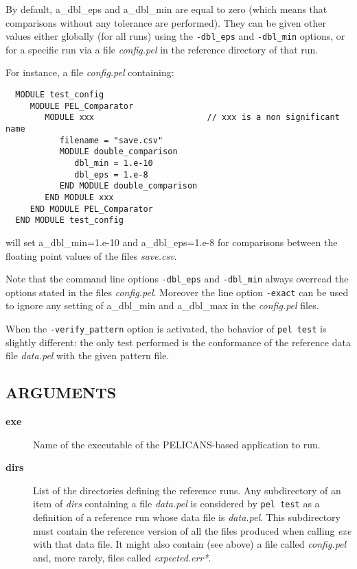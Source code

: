 \documentclass{article}
\begin{document}
\begin{description}
By default, a\_dbl\_eps and a\_dbl\_min are equal to zero (which means that
comparisons without any tolerance are performed).
They can be given other values either globally (for all runs)
using the \texttt{-dbl\_eps} and \texttt{-dbl\_min} options, or for a specific
run via a file \emph{config.pel} in the reference directory of that
run.



For instance, a file \emph{config.pel} containing:

\begin{verbatim}
  MODULE test_config
     MODULE PEL_Comparator
        MODULE xxx                       // xxx is a non significant name
           filename = "save.csv"
           MODULE double_comparison
              dbl_min = 1.e-10
              dbl_eps = 1.e-8
           END MODULE double_comparison
        END MODULE xxx
     END MODULE PEL_Comparator
  END MODULE test_config
\end{verbatim}


will set a\_dbl\_min=1.e-10 and a\_dbl\_eps=1.e-8 for comparisons between
the floating point values of the files \emph{save.csv}.



Note that the command line options \texttt{-dbl\_eps} and \texttt{-dbl\_min}
always overread the options stated in the files \emph{config.pel}.
Moreover the line option \texttt{-exact} can be used to ignore any
setting of a\_dbl\_min and a\_dbl\_max in the \emph{config.pel} files.

\end{description}


When the \texttt{-verify\_pattern} option is activated, the behavior
of \texttt{pel test} is slightly different: the only test performed
is the conformance of the reference data file \emph{data.pel} with
the given pattern file.

\subsection*{ARGUMENTS\label{test_ARGUMENTS}}
\begin{description}

\item[\textbf{exe}] \mbox{}

Name of the executable of the PELICANS-based application to run.


\item[\textbf{dirs}] \mbox{}

List of the directories defining the reference runs. Any subdirectory
of an item of \emph{dirs} containing a file \emph{data.pel} is considered
by \texttt{pel test} as a definition of a reference run whose data file
is \emph{data.pel}. This subdirectory must contain the reference
version of all the files produced when calling \emph{exe} with that
data file. It might also contain (see above) a file called \emph{config.pel}
and, more rarely, files called \emph{expected.err*}.

\end{description}
\end{document}
